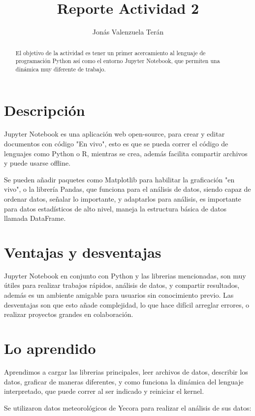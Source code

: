 \documentclass[a4paper]{article}
\title{Reporte Actividad 2}
\author{Jonás Valenzuela Terán}
\begin{document}
\maketitle

\begin{abstract}
El objetivo de la actividad es tener un primer acercamiento al lenguaje de programación Python así como el entorno Jupyter Notebook, que permiten una dinámica muy diferente de trabajo.
\end{abstract}

\section*{Descripción}

Jupyter Notebook es una aplicación web open-source, para crear y editar documentos con código "En vivo", esto es que se pueda correr el código de lenguajes como Python o R, mientras se crea, además facilita compartir archivos y puede usarse offline.

Se pueden añadir paquetes como Matplotlib para habilitar la graficación "en vivo", o la librería Pandas, que funciona para el análisis de datos, siendo capaz de ordenar datos, señalar lo importante, y adaptarlos para análisis, es importante para datos estadísticos de alto nivel, maneja la estructura básica de datos llamada DataFrame.

\section*{Ventajas y desventajas}
Jupyter Notebook en conjunto con Python y las librerias mencionadas, son muy útiles para realizar trabajos rápidos, análisis de datos, y compartir resultados, además es un ambiente amigable para usuarios sin conocimiento previo. Las desventajas son que esto añade complejidad, lo que hace difícil arreglar errores, o realizar proyectos grandes en colaboración.

\section*{Lo aprendido}
Aprendimos a cargar las librerias principales, leer archivos de datos, describir los datos, graficar de maneras diferentes, y como funciona la dinámica del lenguaje interpretado, que puede correr al ser indicado y reiniciar el kernel.

Se utilizaron datos meteorológicos de Yecora para realizar el análisis de sus datos:
\end{document}
